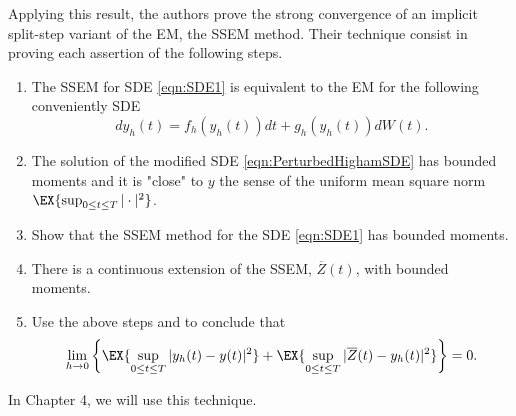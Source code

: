	Applying this result, the authors prove the strong convergence of an implicit split-step variant of the EM, the
SSEM method. 
Their technique consist in proving each assertion of the following steps.
\begin{enumerate}[\bf{Step} 1:]
	\item
		\label{stp:EMCorrespondence}
		The SSEM for SDE \eqref{eqn:SDE1} is equivalent to the EM for the following conveniently SDE
		\begin{equation}\label{eqn:PerturbedHighamSDE}
			dy_h(t)= f_h(y_h(t))dt +g_h(y_h(t))dW(t).
		\end{equation}
	\item\label{stp:PerturbedSolution}
			The solution of the modified SDE \eqref{eqn:PerturbedHighamSDE} has bounded moments and it is 
			"close" to  $y$ the sense of the uniform mean square norm 
			$
				\EX{\sup_{0\leq t\leq T}|\cdot|^2}
			$.
	\item
	\label{stp:MethodBoundedMoments}
		Show that the SSEM method for the SDE \eqref{eqn:SDE1} has bounded moments.
	\item
		There is a continuous extension of the SSEM, $\overline{Z}(t)$, with bounded moments.
	\item
		Use the above steps and  to conclude that
		\begin{equation}
			\lim_{h\to 0}
			\left\{
				\EX{\sup_{0\leq t\leq T}|y_h(t)-y(t)|^2}
			+
			\EX{\sup_{0\leq t\leq T}|\overline{Z}(t) -y_h(t)|^2}
			\right\}=0.
		\end{equation}
\end{enumerate}
In Chapter 4, we will use this technique.
%